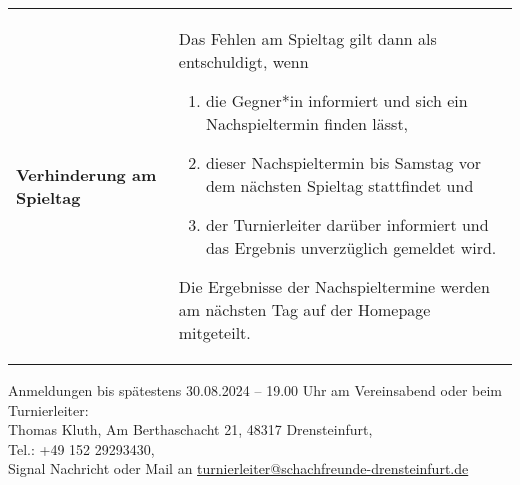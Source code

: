 \documentclass[a4paper,parskip=full-,DIV18]{scrartcl}
\begin{document}
\begin{tabular}{p{3 cm} p{13.5 cm}}
    \textbf{Verhinderung am Spieltag} & Das Fehlen am Spieltag gilt dann als entschuldigt, wenn 
    \begin{enumerate}
        \item die Gegner*in informiert und sich ein Nachspieltermin finden lässt,
        \item dieser Nachspieltermin bis Samstag vor dem nächsten Spieltag stattfindet und
        \item der Turnierleiter darüber informiert und das Ergebnis unverzüglich gemeldet wird.       
    \end{enumerate}
    Die Ergebnisse der Nachspieltermine werden am nächsten Tag auf der Homepage mitgeteilt.   
\end{tabular}

\bigskip
Anmeldungen bis spätestens 30.08.2024 – 19.00 Uhr am Vereinsabend oder beim Turnierleiter:\\
Thomas Kluth, Am Berthaschacht 21, 48317 Drensteinfurt, \\Tel.: +49 152 29293430,\\ Signal Nachricht oder  Mail an 
\href{mailto:turnierleiter@schachfreunde-drensteinfurt.de}{turnierleiter@schachfreunde-drensteinfurt.de}
\end{document}
